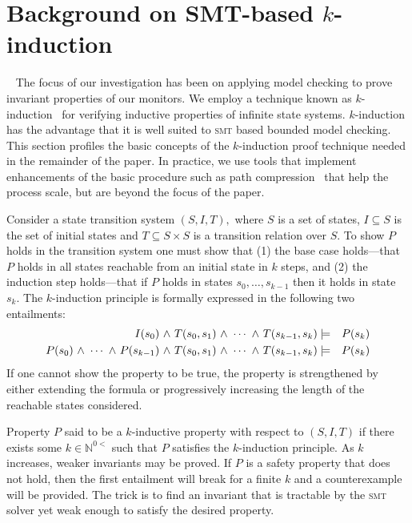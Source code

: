 \section{Background on SMT-based $k$-induction}~\label{sec:background} 
The focus of our  investigation has  been on applying model checking to  prove
invariant properties of our monitors.   We  
employ a  technique known as $k$-induction~\cite{Sheeran00,EenS03} for verifying inductive
properties of infinite state systems.   $k$-induction  has the
advantage that it is well suited  to  \textsc{smt} 
based bounded model checking. This section profiles the
basic concepts of the  $k$-induction proof technique needed in the
remainder of the paper. In practice, we use tools that implement  enhancements of the basic procedure such as path compression~\cite{dMRS03} that help the process scale, but are beyond the focus of the paper. 

Consider  a state transition system  $(S,I,T),$
where $S$ is a set of states, $I \subseteq S$ is the set of initial
states and $T \subseteq S \times S $ is a transition relation over
$S.$ To show $P$ holds in the transition system one must show that (1)
the base case holds---that $P$ holds in all states reachable
from an initial state in $k$ steps, and (2) the induction step holds---that if $P$ holds in states $s_0,\ldots,s_{k-1}$ then it holds in
state $s_k.$ The $k$-induction principle is formally expressed in the
following two entailments:
\begin{eqnarray*}
I(s_0) {\ \wedge \ } T(s_0,s_1) {\ \wedge \ } \cdots {\ \wedge \ } T(s_{k-1},s_k) &\models&
P(s_k) \\
P(s_0) {\ \wedge \ } \cdots {\ \wedge \ } P(s_{k-1}) {\ \wedge \ } T(s_0,s_1) {\ \wedge \ } \cdots {\ \wedge \ } T(s_{k-1},s_k) &\models&
P(s_k) 
\end{eqnarray*} 
If one cannot show the property to be true, the
property is strengthened by either extending the formula or
progressively increasing the length of the reachable states
considered.  

Property $P$ said to be a $k$-inductive property with respect to
$(S,I,T)$ if there exists some $k \in \mathbb{N}^{0<}$ such that $P$
satisfies the $k$-induction principle. As $k$ increases, weaker
invariants may be proved. If $P$ is a safety property that does not hold, then the first entailment will break for a finite $k$ and a counterexample will be provided. The trick is to find an invariant that is
tractable by the \textsc{smt} solver yet weak enough to satisfy the desired
property.  
